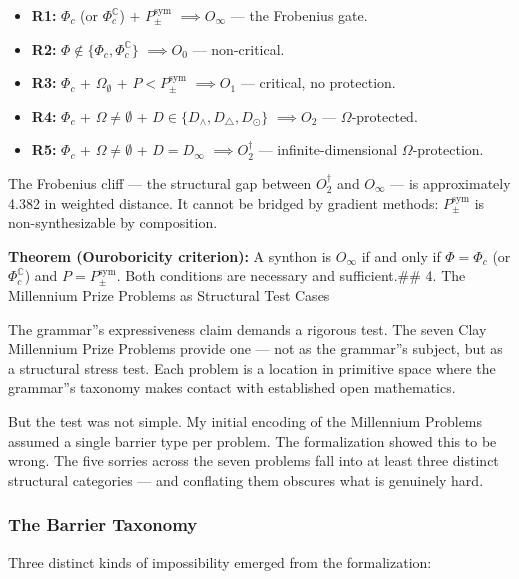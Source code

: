 \documentclass[12pt,a4paper]{article}
\begin{document}
\begin{itemize}
    \item \textbf{R1:} $\Phi_c$ (or $\Phi_c^\mathbb{C}$) + $P_{\pm}^{\text{sym}}$ $\implies O_{\infty}$ --- the Frobenius gate.
    \item \textbf{R2:} $\Phi \notin \{\Phi_c, \Phi_c^\mathbb{C}\}$ $\implies O_0$ --- non-critical.
    \item \textbf{R3:} $\Phi_c$ + $\Omega_{\emptyset}$ + $P < P_{\pm}^{\text{sym}}$ $\implies O_1$ --- critical, no protection.
    \item \textbf{R4:} $\Phi_c$ + $\Omega \neq \emptyset$ + $D \in \{D_{\wedge}, D_{\triangle}, D_{\odot}\}$ $\implies O_2$ --- $\Omega$-protected.
    \item \textbf{R5:} $\Phi_c$ + $\Omega \neq \emptyset$ + $D = D_{\infty}$ $\implies O_2^\dagger$ --- infinite-dimensional $\Omega$-protection.
\end{itemize}

The Frobenius cliff --- the structural gap between $O_2^\dagger$ and $O_{\infty}$ --- is approximately 4.382 in weighted distance. It cannot be bridged by gradient methods: $P_{\pm}^{\text{sym}}$ is non-synthesizable by composition.

\textbf{Theorem (Ouroboricity criterion):} A synthon is $O_{\infty}$ if and only if $\Phi = \Phi_c$ (or $\Phi_c^\mathbb{C}$) and $P = P_{\pm}^{\text{sym}}$. Both conditions are necessary and sufficient.\#\# 4. The Millennium Prize Problems as Structural Test Cases

The grammar''s expressiveness claim demands a rigorous test. The seven Clay Millennium Prize Problems provide one --- not as the grammar''s subject, but as a structural stress test. Each problem is a location in primitive space where the grammar''s taxonomy makes contact with established open mathematics.

But the test was not simple. My initial encoding of the Millennium Problems assumed a single barrier type per problem. The formalization showed this to be wrong. The five sorries across the seven problems fall into at least three distinct structural categories --- and conflating them obscures what is genuinely hard.

\subsubsection{The Barrier Taxonomy}

Three distinct kinds of impossibility emerged from the formalization:
\end{document}

